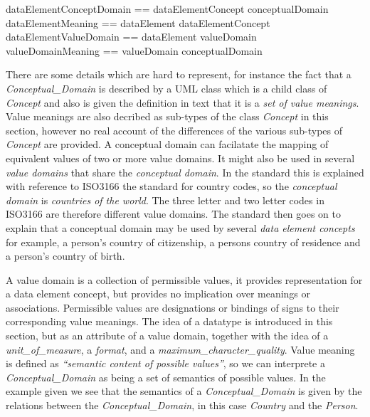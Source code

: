 \documentclass{llncs}
\begin{document}
\begin{zed}
dataElementConceptDomain == dataElementConcept \pfun conceptualDomain\\
dataElementMeaning == dataElement \pfun dataElementConcept\\
dataElementValueDomain == dataElement \pfun valueDomain \\
valueDomainMeaning == valueDomain \pfun conceptualDomain \\
\end{zed}



There are some details which are hard to represent, for instance the fact that a \emph{Conceptual\_Domain} is described by a UML class which is a child class of \emph{Concept} and also is given the definition in text that it is a \emph{set of value meanings}. Value meanings are also decribed as sub-types of the class \emph{Concept} in this section, however no real account of the differences of the various sub-types of \emph{Concept} are provided.  A conceptual domain can facilatate the mapping of equivalent values of two or more value domains. It might also be used in several \emph{value domains} that share the \emph{conceptual domain}. In the standard this is explained with reference to ISO3166 the standard for country codes, so the \emph{conceptual domain} is \emph{countries of the world}. The three letter and two letter codes in ISO3166 are therefore different value domains. The standard then goes on to explain that a conceptual domain may be used by several \emph{data element concepts} for example, a person's country of citizenship, a persons country of residence and a person's country of birth. 

A value domain is a collection of permissible values, it provides representation for a data element concept, but provides no implication over meanings or associations. Permissible values are designations or bindings of signs to their corresponding value meanings. The idea of a datatype is introduced in this section, but as an attribute of a value domain, together with the idea of a \emph{unit\_of\_measure}, a \emph{format}, and a \emph{maximum\_character\_quality}. Value meaning is defined as \emph{``semantic content of possible values''}, so we can interprete a  \emph{Conceptual\_Domain} as being a set of semantics of possible values. In the example given we see that the semantics of a \emph{Conceptual\_Domain} is given by the relations between the \emph{Conceptual\_Domain}, in this case \emph{Country} and the \emph{Person}.
\end{document}
